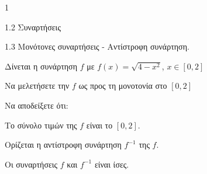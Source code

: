 \begin{ylh}{1}
    \item 1.2 Συναρτήσεις
    \item 1.3 Μονότονες συναρτήσεις - Αντίστροφη συνάρτηση.
\end{ylh}
Δίνεται η συνάρτηση $f$ με $f(x) = \sqrt{4-x^2}$, $x\in[0,2]$
\begin{alist}
\item Να μελετήσετε την $f$ ως προς τη μονοτονία στο $[0,2]$ 
\item Να αποδείξετε ότι:
    \begin{rlist}
    \item Το σύνολο τιμών της $f$ είναι το $[0, 2]$. 
    \item Ορίζεται η αντίστροφη συνάρτηση $f^{-1}$ της $f$. 
    \item Οι συναρτήσεις $f$ και $f^{-1}$ είναι ίσες. 
    \end{rlist}
\end{alist}